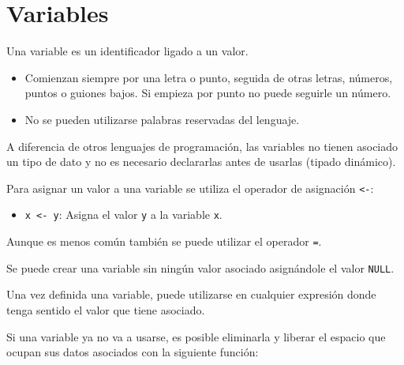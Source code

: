 \documentclass[
  a4paper,
]{scrreport}
\providecommand{\tightlist}{%
  \setlength{\itemsep}{0pt}\setlength{\parskip}{0pt}}\usepackage{longtable,booktabs,array}
\theoremstyle{definition}
\theoremstyle{definition}
\theoremstyle{remark}
\begin{document}
\section{Variables}\label{variables}

Una variable es un identificador ligado a un valor.

\begin{tcolorbox}[enhanced jigsaw, title=\textcolor{quarto-callout-note-color}{\faInfo}\hspace{0.5em}{Reglas para nombrar variables}, titlerule=0mm, toprule=.15mm, colbacktitle=quarto-callout-note-color!10!white, arc=.35mm, colframe=quarto-callout-note-color-frame, opacitybacktitle=0.6, coltitle=black, left=2mm, colback=white, opacityback=0, breakable, bottomrule=.15mm, toptitle=1mm, leftrule=.75mm, bottomtitle=1mm, rightrule=.15mm]

\begin{itemize}
\tightlist
\item
  Comienzan siempre por una letra o punto, seguida de otras letras,
  números, puntos o guiones bajos. Si empieza por punto no puede
  seguirle un número.
\item
  No se pueden utilizarse palabras reservadas del lenguaje.
\end{itemize}

\end{tcolorbox}

A diferencia de otros lenguajes de programación, las variables no tienen
asociado un tipo de dato y no es necesario declararlas antes de usarlas
(tipado dinámico).

Para asignar un valor a una variable se utiliza el operador de
asignación \texttt{\textless{}-}:

\begin{itemize}
\tightlist
\item
  \texttt{x\ \textless{}-\ y}: Asigna el valor \texttt{y} a la variable
  \texttt{x}.
\end{itemize}

Aunque es menos común también se puede utilizar el operador \texttt{=}.

Se puede crear una variable sin ningún valor asociado asignándole el
valor \texttt{NULL}.

Una vez definida una variable, puede utilizarse en cualquier expresión
donde tenga sentido el valor que tiene asociado.

Si una variable ya no va a usarse, es posible eliminarla y liberar el
espacio que ocupan sus datos asociados con la siguiente función:
\end{document}
